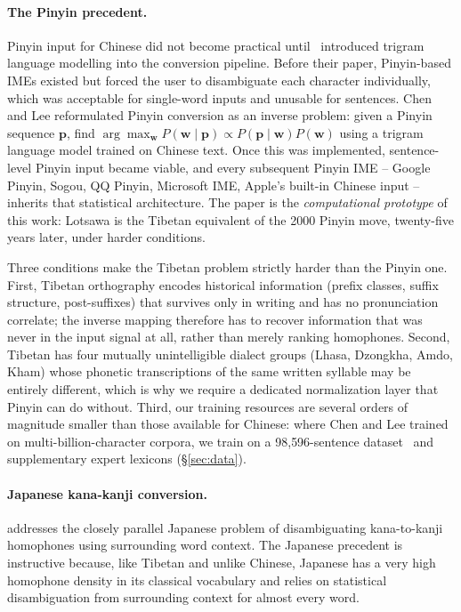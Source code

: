 \documentclass[11pt]{article}
\begin{document}
\paragraph{The Pinyin precedent.}
Pinyin input for Chinese did not become practical until~\citet{chen2000pinyin} introduced trigram language modelling into the conversion pipeline. Before their paper, Pinyin-based IMEs existed but forced the user to disambiguate each character individually, which was acceptable for single-word inputs and unusable for sentences. Chen and Lee reformulated Pinyin conversion as an inverse problem: given a Pinyin sequence $\mathbf{p}$, find $\arg\max_{\mathbf{w}} P(\mathbf{w} \mid \mathbf{p}) \propto P(\mathbf{p} \mid \mathbf{w}) P(\mathbf{w})$ using a trigram language model trained on Chinese text. Once this was implemented, sentence-level Pinyin input became viable, and every subsequent Pinyin IME -- Google Pinyin, Sogou, QQ Pinyin, Microsoft IME, Apple's built-in Chinese input -- inherits that statistical architecture. The paper is the \emph{computational prototype} of this work: Lotsawa is the Tibetan equivalent of the 2000 Pinyin move, twenty-five years later, under harder conditions.

Three conditions make the Tibetan problem strictly harder than the Pinyin one. First, Tibetan orthography encodes historical information (prefix classes, suffix structure, post-suffixes) that survives only in writing and has no pronunciation correlate; the inverse mapping therefore has to recover information that was never in the input signal at all, rather than merely ranking homophones. Second, Tibetan has four mutually unintelligible dialect groups (Lhasa, Dzongkha, Amdo, Kham) whose phonetic transcriptions of the same written syllable may be entirely different, which is why we require a dedicated normalization layer that Pinyin can do without. Third, our training resources are several orders of magnitude smaller than those available for Chinese: where Chen and Lee trained on multi-billion-character corpora, we train on a 98{,}596-sentence dataset~\cite{billingsmoore_hf} and supplementary expert lexicons (\S\ref{sec:data}).

\paragraph{Japanese kana-kanji conversion.}
\citet{takahashi1996kana} addresses the closely parallel Japanese problem of disambiguating kana-to-kanji homophones using surrounding word context. The Japanese precedent is instructive because, like Tibetan and unlike Chinese, Japanese has a very high homophone density in its classical vocabulary and relies on statistical disambiguation from surrounding context for almost every word.
\end{document}

